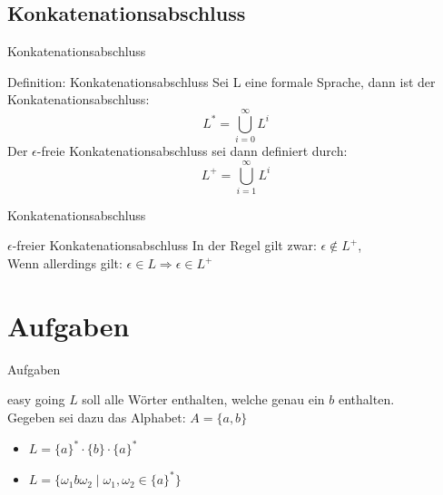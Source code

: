	
	\subsection{Konkatenationsabschluss}
	\begin{frame}{Konkatenationsabschluss}
		\begin{block}{Definition: Konkatenationsabschluss}
			Sei L eine formale Sprache, dann ist der Konkatenationsabschluss:
			\begin{displaymath}
				L^* = \bigcup_{i=0}^{\infty}L^i
			\end{displaymath}
			\pause
			Der $\epsilon$-freie Konkatenationsabschluss sei dann definiert durch:
			\begin{displaymath}
				L^+ = \bigcup_{i=1}^{\infty}L^i
			\end{displaymath}
		\end{block}
	\end{frame}


	\begin{frame}{Konkatenationsabschluss}
		\begin{alertblock}{$\epsilon$-freier Konkatenationsabschluss}
			In der Regel gilt zwar: $\epsilon \not\in L^+$,\\
			Wenn allerdings gilt: $\epsilon \in L \Rightarrow \epsilon \in L^+$
		\end{alertblock}
	\end{frame}
	
	
	\section{Aufgaben}
	\begin{frame} {Aufgaben}
		\begin{block} {easy going}
			$L$ soll alle Wörter enthalten, welche genau ein $b$ enthalten.\\
			Gegeben sei dazu das Alphabet: $A = \{a,b\}$\\
			\vspace{10pt}
			\visible<2> {
				\begin{itemize}
					\item $L = \{a\}^* \cdot \{b\} \cdot \{a\}^*$
					\item $L = \{\omega_1b\omega_2 \; | \; \omega_1, \omega_2 \in \{a\}^*\}$
				\end{itemize}
			}
		\end{block}
	\end{frame}

